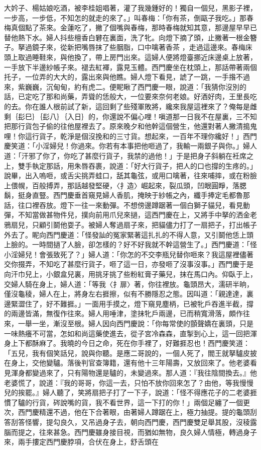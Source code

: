 大妗子、楊姑娘吃酒，被李桂姐唱著，灌了我幾鍾好的！獨自一個兒，黑影子裡，一步高，一步低，不知怎的就走的來了。」叫春梅：「你有茶，倒甌子我吃。」那春梅真個點了茶來。金蓮吃了，撇了個嘴與春梅，那時春梅就知其意，那邊屋早早已替他熱下水。婦人抖些檀香白礬在裏面，洗了牝。向燈下摘了頭，止撇著一根金簪子。拏過鏡子來，從新把嘴唇抹了些胭脂，口中噙著香茶 ，走過這邊來。春梅床頭上取過睡鞋來，與他換了，帶上房門出來。這婦人便將燈臺挪近床邊桌上放著，一手放下半邊紗帳子來。褪去紅褌，露見玉體。西門慶坐在枕頭上，那話帶著兩個托子，一位弄的大大的，露出來與他瞧。婦人燈下看見，諕了一跳，一手揝不過來，紫巍巍，沉甸甸，約有虎二。便眤瞅了西門慶一眼，說道：「我猜你沒別的話，已定吃了那和尚藥，弄聳的恁般大，一位要來奈何老娘。好酒好肉，王里長吃的去。你在誰人根前試了新，這回剩了些殘軍敗將，纔來我屋這裡來了？俺每是雌剩｛髟巳｝｛髟八｝｛入日｝的，你還說不偏心哩！嗔道那一日我不在屋裏，三不知把那行貨包子偷的往他屋裡去了。原來晚夕和他幹這個營生，他還對著人撇清搗鬼哩！你這行貨子，乾淨是個沒挽和的三寸貨。想起來，一百年不理你纔好！」西門慶笑道：「小淫婦兒！你過來。你若有本事把他咂過了，我輸一兩銀子與你。」婦人道：「汗邪了你了，你吃了甚麼行貨子，我禁的過他！」于是把身子斜躺在衽席之上，雙手執定那話，用朱唇吞裹，說道：「好大行貨子，把人的口也撐的生疼的。」說畢，出入嗚咂，或舌尖挑弄蛙口，舐其龜弦，或用口噙著，往來哺摔，或在粉臉上偎幌，百般搏弄，那話越發堅硬，〈扌造〉崛起來，裂瓜頭，凹眼圓睜，落腮鬍，挺身直豎。西門慶垂首窺見婦人香肌，掩映于紗帳之內，纖手捧定毛都魯那話，往口裡吞放。燈下一往一來動彈。不想傍邊蹲踞著一個白獅子貓兒，看見動彈，不知當做甚物件兒，撲向前用爪兒來撾，這西門慶在上，又將手中拏的洒金老鴉扇兒，只顧引鬬他耍子。被婦人奪過扇子來，把貓儘力打了一扇把子，打出帳子外去了。眤向西門慶道：「怪發訕的冤家緊著這扎扎的不得人意，又引鬬他恁上頭上臉的。一時間撾了人臉，卻怎樣的？好不好我就不幹這營生了。」西門慶道：「怪小淫婦兒！會張致死了？」婦人道：「你怎的不交李瓶兒替你咂來？我這屋裡儘著交你掇弄，不知吃了甚麼行貨子，咂了這一日，亦發咂了沒事沒事。」西門慶于是向汗巾兒上，小銀盒兒裏，用挑牙挑了些粉紅膏子藥兒，抹在馬口內。仰臥于上，交婦人騎在身上，婦人道：「等我〈扌扉〉著，你往裡放。龜頭昂大，濡研半晌，僅沒龜稜，婦人在上，將身左右捱擦，似有不勝隱忍之態。因叫道：「親達達，裏邊緊澀住了，好不難捱。」一面用手摸之，燈下窺見塵柄，已被牝戶吞進半截，撐的兩邊皆滿，無復作往來。婦人用唾津，塗抹牝戶兩邊，已而稍寬滑落，頗作往來，一舉一坐，漸沒至根。婦人因向西門慶說：「你每常使的顫聲嬌在裏頭，只是一味熱癢不可當，怎如和尚這藥使進去，從子宮冷森森，直掣到心上，這一回把渾身上下都酥麻了。我曉的今日之命，死在你手裡了，好難捱忍也！西門慶笑道：「五兒，我有個笑話兒，說與你聽。是應二哥說的，一個人死了，閻王就拏驢皮披在身上，交他變驢。落後判官查簿籍，還有他十三年陽壽，又放回來了。他老婆看見渾身都變過來了，只有陽物還是驢的，未變過來。那人道：『我往陰間換去。』他老婆慌了，說道：『我的哥哥，你這一去，只怕不放你回來怎了？由他，等我慢慢兒的挨罷。』婦人聽了，笑將扇把子打了一下子，說道：「怪不得應花子的二老婆捱慣了驢的行貨，硶說嘴的貨，我不看世界，這一下打的你！」兩個足纏了一個更次，西門慶精還不過，他在下合著眼，由著婦人蹲踞在上，極力抽提。提的龜頭刮答刮答怪響，提勾良久，又吊過身子去，朝向西門慶，西門慶雙足舉其股，沒稜露腦而提之，往來甚急。西門慶雖身接目視，而猶如無物，良久婦人情極，轉過身子來，兩手摟定西門慶脖項，合伏在身上，舒舌頭在
